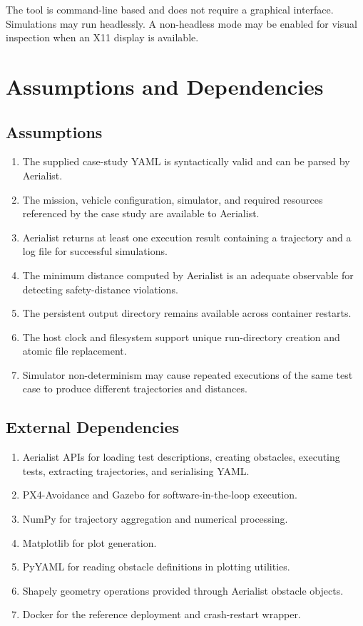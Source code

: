 \documentclass[11pt,a4paper]{report}
\begin{document}
The tool is command-line based and does not require a graphical interface. Simulations may run headlessly. A non-headless mode may be enabled for visual inspection when an X11 display is available.

\section{Assumptions and Dependencies}
\subsection{Assumptions}
\begin{enumerate}[label=\textbf{A-\arabic*:}]
  \item The supplied case-study YAML is syntactically valid and can be parsed by Aerialist.
  \item The mission, vehicle configuration, simulator, and required resources referenced by the case study are available to Aerialist.
  \item Aerialist returns at least one execution result containing a trajectory and a log file for successful simulations.
  \item The minimum distance computed by Aerialist is an adequate observable for detecting safety-distance violations.
  \item The persistent output directory remains available across container restarts.
  \item The host clock and filesystem support unique run-directory creation and atomic file replacement.
  \item Simulator non-determinism may cause repeated executions of the same test case to produce different trajectories and distances.
\end{enumerate}

\subsection{External Dependencies}
\begin{enumerate}[label=\textbf{D-\arabic*:}]
  \item Aerialist APIs for loading test descriptions, creating obstacles, executing tests, extracting trajectories, and serialising YAML.
  \item PX4-Avoidance and Gazebo for software-in-the-loop execution.
  \item NumPy for trajectory aggregation and numerical processing.
  \item Matplotlib for plot generation.
  \item PyYAML for reading obstacle definitions in plotting utilities.
  \item Shapely geometry operations provided through Aerialist obstacle objects.
  \item Docker for the reference deployment and crash-restart wrapper.
\end{enumerate}
\end{document}
